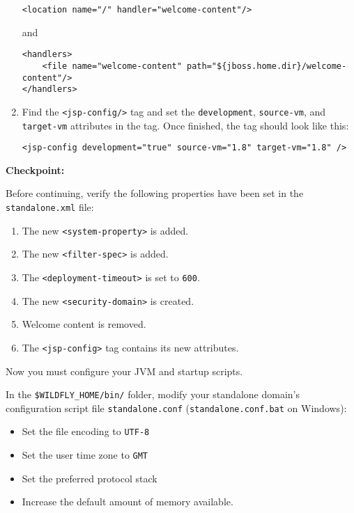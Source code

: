 \begin{enumerate}
\begin{verbatim}
<location name="/" handler="welcome-content"/>
\end{verbatim}

  and

\begin{verbatim}
<handlers>
    <file name="welcome-content" path="${jboss.home.dir}/welcome-content"/>
</handlers>
\end{verbatim}
\item
  Find the \texttt{\textless{}jsp-config/\textgreater{}} tag and set the
  \texttt{development}, \texttt{source-vm}, and \texttt{target-vm}
  attributes in the tag. Once finished, the tag should look like this:

\begin{verbatim}
<jsp-config development="true" source-vm="1.8" target-vm="1.8" />
\end{verbatim}
\end{enumerate}

\textbf{Checkpoint:}

Before continuing, verify the following properties have been set in the
\texttt{standalone.xml} file:

\begin{enumerate}
\def\labelenumi{\arabic{enumi}.}
\item
  The new \texttt{\textless{}system-property\textgreater{}} is added.
\item
  The new \texttt{\textless{}filter-spec\textgreater{}} is added.
\item
  The \texttt{\textless{}deployment-timeout\textgreater{}} is set to
  \texttt{600}.
\item
  The new \texttt{\textless{}security-domain\textgreater{}} is created.
\item
  Welcome content is removed.
\item
  The \texttt{\textless{}jsp-config\textgreater{}} tag contains its new
  attributes.
\end{enumerate}

Now you must configure your JVM and startup scripts.

In the \texttt{\$WILDFLY\_HOME/bin/} folder, modify your standalone
domain's configuration script file \texttt{standalone.conf}
(\texttt{standalone.conf.bat} on Windows):

\begin{itemize}
\tightlist
\item
  Set the file encoding to \texttt{UTF-8}
\item
  Set the user time zone to \texttt{GMT}
\item
  Set the preferred protocol stack
\item
  Increase the default amount of memory available.
\end{itemize}

